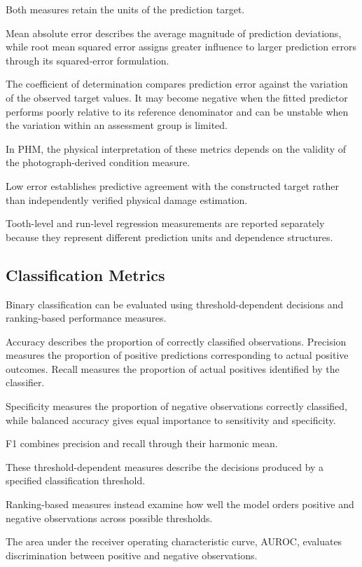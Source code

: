 Both measures retain the units of the prediction target.

Mean absolute error describes the average magnitude of prediction deviations, while root mean squared error assigns greater influence to larger prediction errors through its squared-error formulation.

The coefficient of determination compares prediction error against the variation of the observed target values. It may become negative when the fitted predictor performs poorly relative to its reference denominator and can be unstable when the variation within an assessment group is limited.

In PHM, the physical interpretation of these metrics depends on the validity of the photograph-derived condition measure.

Low error establishes predictive agreement with the constructed target rather than independently verified physical damage estimation.

Tooth-level and run-level regression measurements are reported separately because they represent different prediction units and dependence structures.

\subsection{Classification Metrics}

Binary classification can be evaluated using threshold-dependent decisions and ranking-based performance measures.

Accuracy describes the proportion of correctly classified observations. Precision measures the proportion of positive predictions corresponding to actual positive outcomes. Recall measures the proportion of actual positives identified by the classifier.

Specificity measures the proportion of negative observations correctly classified, while balanced accuracy gives equal importance to sensitivity and specificity.

F1 combines precision and recall through their harmonic mean.

These threshold-dependent measures describe the decisions produced by a specified classification threshold.

Ranking-based measures instead examine how well the model orders positive and negative observations across possible thresholds.

The area under the receiver operating characteristic curve, AUROC, evaluates discrimination between positive and negative observations.


